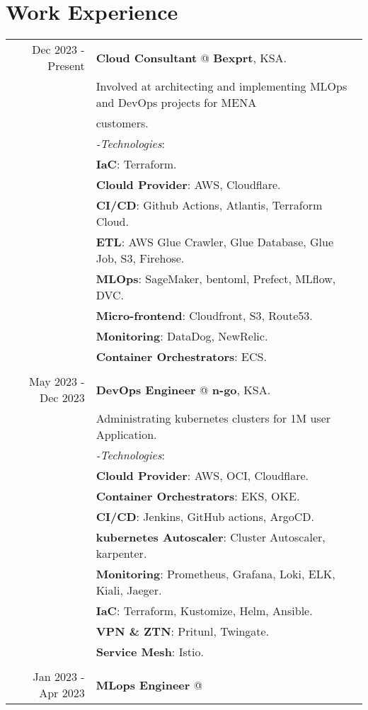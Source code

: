 \documentclass[a4paper,10pt]{article}
\begin{document}
\section{\textbf{Work Experience}}
\begin{tabular}{r|l}
    Dec 2023 - Present& \textbf{Cloud Consultant} @
    \textbf{Bexprt}, KSA. \\&
    Involved at architecting and implementing MLOps and DevOps projects for MENA \\& customers. \\&
    \textit{-Technologies}:\\&
    \textbf{IaC}: Terraform. \\&
    \textbf{Clould Provider}: AWS, Cloudflare. \\&
    \textbf{CI/CD}: Github Actions, Atlantis, Terraform Cloud. \\&
    \textbf{ETL}: AWS Glue Crawler, Glue Database, Glue Job, S3, Firehose. \\&
    \textbf{MLOps}: SageMaker, bentoml, Prefect, MLflow, DVC. \\&
    \textbf{Micro-frontend}: Cloudfront, S3, Route53. \\&
    \textbf{Monitoring}: DataDog, NewRelic. \\&
    \textbf{Container Orchestrators}: ECS. \\&
    \\
    May 2023 - Dec 2023 & \textbf{DevOps Engineer} @
    \textbf{n-go}, KSA. \\&
    Administrating kubernetes clusters for 1M user Application. \\&
    \textit{-Technologies}:\\&
    \textbf{Clould Provider}: AWS, OCI, Cloudflare. \\&
    \textbf{Container Orchestrators}: EKS, OKE. \\&
    \textbf{CI/CD}: Jenkins, GitHub actions, ArgoCD. \\&
    \textbf{kubernetes Autoscaler}: Cluster Autoscaler, karpenter. \\&
    \textbf{Monitoring}: Prometheus, Grafana, Loki, ELK, Kiali, Jaeger. \\&
    \textbf{IaC}: Terraform, Kustomize, Helm, Ansible.\\&
    \textbf{VPN \& ZTN}: Pritunl, Twingate. \\&
    \textbf{Service Mesh}: Istio. \\&
    \\
    Jan 2023 - Apr 2023 & \textbf{MLops Engineer} @

\end{tabular}
\end{document}
